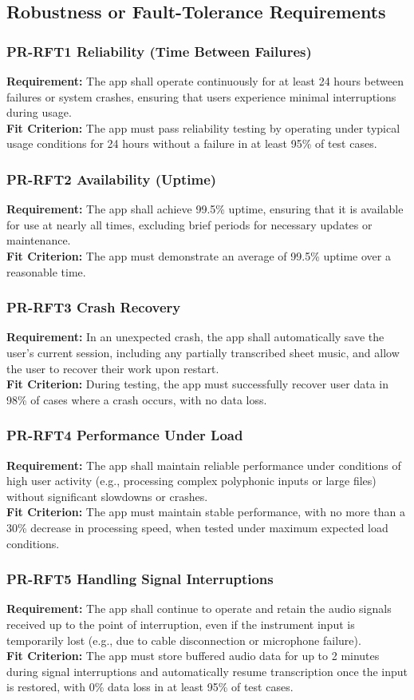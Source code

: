\documentclass[12pt]{article}
\begin{document}
\subsection{Robustness or Fault-Tolerance Requirements}
\subsubsection*{PR-RFT1 Reliability (Time Between Failures)}
\textbf{Requirement:} The app shall operate continuously for at least 24 hours between failures or system crashes, ensuring that users experience minimal interruptions during usage.\\
\textbf{Fit Criterion:} The app must pass reliability testing by operating under typical usage conditions for 24 hours without a failure in at least 95\% of test cases.
\subsubsection*{PR-RFT2 Availability (Uptime)}
\textbf{Requirement:} The app shall achieve 99.5\% uptime, ensuring that it is available for use at nearly all times, excluding brief periods for necessary updates or maintenance.\\
\textbf{Fit Criterion:} The app must demonstrate an average of 99.5\% uptime over a reasonable time.
\subsubsection*{PR-RFT3 Crash Recovery}
\textbf{Requirement:} In an unexpected crash, the app shall automatically save the user’s current session, including any partially transcribed sheet music, and allow the user to recover their work upon restart.\\
\textbf{Fit Criterion:} During testing, the app must successfully recover user data in 98\% of cases where a crash occurs, with no data loss.
\subsubsection*{PR-RFT4 Performance Under Load}
\textbf{Requirement:} The app shall maintain reliable performance under conditions of high user activity (e.g., processing complex polyphonic inputs or large files) without significant slowdowns or crashes.\\
\textbf{Fit Criterion:} The app must maintain stable performance, with no more than a 30\% decrease in processing speed, when tested under maximum expected load conditions.
\subsubsection*{PR-RFT5 Handling Signal Interruptions}
\textbf{Requirement:} The app shall continue to operate and retain the audio signals received up to the point of interruption, even if the instrument input is temporarily lost (e.g., due to cable disconnection or microphone failure).\\
\textbf{Fit Criterion:} The app must store buffered audio data for up to 2 minutes during signal interruptions and automatically resume transcription once the input is restored, with 0\% data loss in at least 95\% of test cases.
\end{document}
